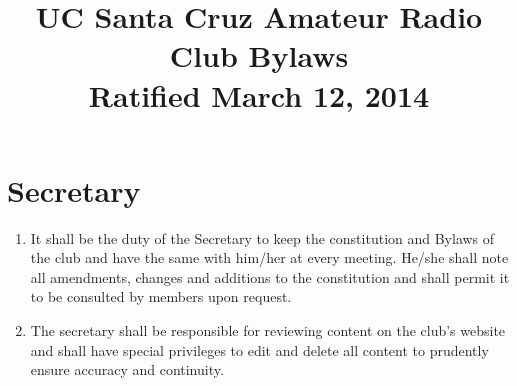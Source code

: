 \documentclass{report}
\begin{document}
\title{UC Santa Cruz Amateur Radio Club Bylaws \\ \small{Ratified March 12, 2014}}
\author{}
\date{}
\maketitle

\tableofcontents

\pagebreak

\chapter{Secretary}
\begin{enumerate}
\item It shall be the duty of the Secretary to keep the constitution and Bylaws of the club and have the same with him/her at every meeting. He/she shall note all amendments, changes and additions to the constitution and shall permit it to be consulted by members upon request.

\item The secretary shall be responsible for reviewing content on the club's website and shall have special privileges to edit and delete all content to prudently ensure accuracy and continuity. 

\end{enumerate}
\end{document}
